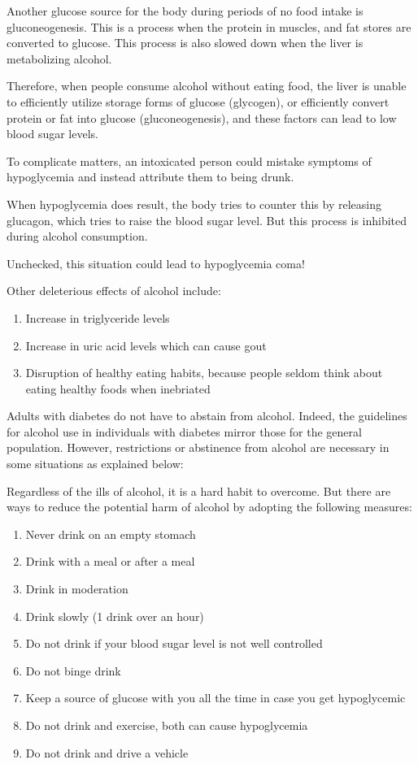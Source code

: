 Another glucose source for the body during periods of no food intake is gluconeogenesis. This is a process when the protein in muscles, and fat stores are converted to glucose. This process is also slowed down when the liver is metabolizing alcohol. 

Therefore, when people consume alcohol without eating food, the liver is unable to efficiently utilize storage forms of glucose (glycogen), or efficiently convert protein or fat into glucose (gluconeogenesis), and these factors can lead to low blood sugar levels.

To complicate matters, an intoxicated person could mistake symptoms of hypoglycemia and instead attribute them to being drunk. 

When hypoglycemia does result, the body tries to counter this by releasing glucagon, which tries to raise the blood sugar level. But this process is inhibited during alcohol consumption. 

Unchecked, this situation could lead to hypoglycemia coma!

\noindent Other deleterious effects of alcohol include:

\begin{enumerate}[•]
\itemsep=0pt
\item Increase in triglyceride levels
\item Increase in uric acid levels which can cause gout
\item Disruption of healthy eating habits, because people seldom think about eating healthy foods when inebriated
\end{enumerate}

Adults with diabetes do not have to abstain from alcohol. Indeed, the guidelines for alcohol use in individuals with diabetes mirror those for the general population. However, restrictions or abstinence from alcohol are necessary in some situations as explained below:

Regardless of the ills of alcohol, it is a hard habit to overcome. But there are ways to reduce the potential harm of alcohol by adopting the following measures:

\begin{enumerate}[•]
\itemsep=0pt
\item Never drink on an empty stomach
\item Drink with a meal or after a meal
\item Drink in moderation
\item Drink slowly (1 drink over an hour)
\item Do not drink if your blood sugar level is not well controlled
\item Do not binge drink
\item Keep a source of glucose with you all the time in case you get hypoglycemic
\item Do not drink and exercise, both can cause hypoglycemia
\item Do not drink and drive a vehicle
\end{enumerate}

